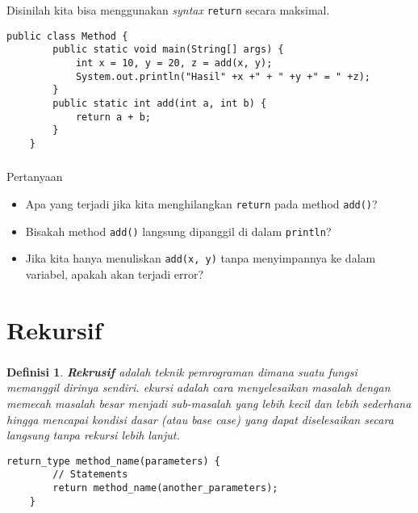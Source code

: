\documentclass[aspectratio=169]{beamer}
\newtheorem*{definisi}{Definisi}
\theoremstyle{definition}
\begin{document}
    \begin{frame}[fragile]
        \frametitle{\insertsection}
        \framesubtitle{\insertsubsection}
        Disinilah kita bisa menggunakan \textit{syntax} \texttt{return} secara maksimal. 
        \begin{lstlisting}[caption={Penjumlahan Dua Bilangan}]
    public class Method {
        public static void main(String[] args) {
            int x = 10, y = 20, z = add(x, y);
            System.out.println("Hasil" +x +" + " +y +" = " +z);
        }
        public static int add(int a, int b) {
            return a + b;
        }
    }
        \end{lstlisting}
    \end{frame}

    \begin{frame}
        \frametitle{\insertsection}
        \framesubtitle{\insertsubsection}
        \begin{block}{Pertanyaan}
            \begin{itemize}[label=$\bullet$]
                \item Apa yang terjadi jika kita menghilangkan \texttt{return} pada method \texttt{add()}?
                \item Bisakah method \texttt{add()} langsung dipanggil di dalam \texttt{println}?
                \item Jika kita hanya menuliskan \texttt{add(x, y)} tanpa menyimpannya ke dalam variabel, apakah akan terjadi error?
            \end{itemize}
        \end{block}
    \end{frame}



    \section{Rekursif}
    \begin{frame}[fragile]
        \frametitle{\insertsection}
        \begin{definisi}
            \textbf{Rekrusif} adalah teknik pemrograman dimana suatu fungsi memanggil dirinya sendiri. ekursi adalah cara menyelesaikan masalah dengan memecah masalah besar menjadi sub-masalah yang lebih kecil dan lebih sederhana hingga mencapai kondisi dasar (atau \textit{base case}) yang dapat diselesaikan secara langsung tanpa rekursi lebih lanjut.
        \end{definisi}
        \begin{lstlisting}[caption={Salah satu struktur Rekrusif}]
    return_type method_name(parameters) {
        // Statements
        return method_name(another_parameters);
    }
        \end{lstlisting}
    \end{frame}
\end{document}
